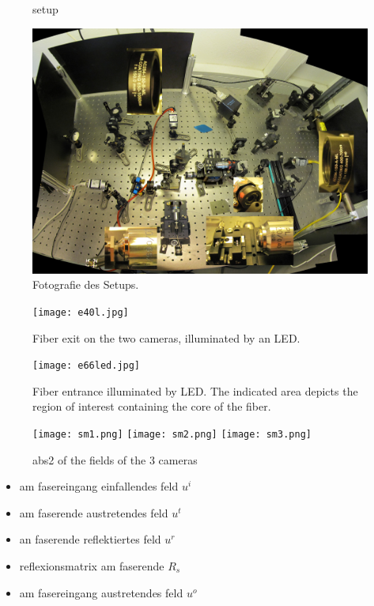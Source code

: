 \documentclass{article}
\begin{document}
\begin{figure}[htbp]
  \centering
  
  \caption{setup}
  \label{fig:setup}
\end{figure}



\begin{figure}[htbp]
  \centering
  \includegraphics[width=12cm]{../multi-mode-imaging.jpg}
  \caption{Fotografie des Setups. }
  \label{fig:e40}
\end{figure}


\begin{figure}[htbp]
  \centering
  \texttt{[image: e40l.jpg]}
  \caption{Fiber exit on the two cameras, illuminated by an LED.}
  \label{fig:e40}
\end{figure}

\begin{figure}[htbp]
  \centering
  \texttt{[image: e66led.jpg]}
  \caption{Fiber entrance illuminated by LED. The indicated area
    depicts the region of interest containing the core of the fiber.}
  \label{fig:e66}
\end{figure}

\begin{figure}[htbp]
  \centering
  \texttt{[image: sm1.png]}
  \texttt{[image: sm2.png]}
  \texttt{[image: sm3.png]}
  \caption{abs2 of the fields of the 3 cameras}
  \label{fig:mosaic}
\end{figure}


\begin{itemize}
\item am fasereingang einfallendes feld $u^i$
\item am faserende austretendes feld $u^t$
\item an faserende reflektiertes feld $u^r$
\item reflexionsmatrix am faserende $R_s$
\item am fasereingang austretendes feld $u^o$
\end{itemize}
\end{document}
